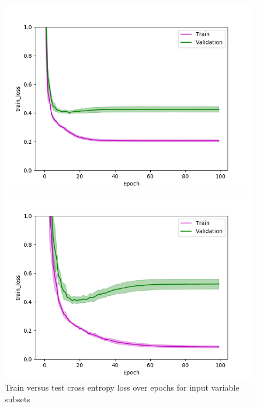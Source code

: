 \def\year{2017}\relax \documentclass[letterpaper]{article}
\begin{document}
\begin{figure}
\begin{minipage}{.24\textwidth}
  \centering
\includegraphics[width=\textwidth]{pics/d3_train_loss_mean_train_test.png}
\caption{$D_3$}\label{fig:d3losstraintest}
\end{minipage}
\begin{minipage}{.01\textwidth}
\end{minipage}
\begin{minipage}{.24\textwidth}
  \centering
\includegraphics[width=\textwidth]{pics/d4_train_loss_mean_train_test.png}
\caption{$D_4$}\label{fig:d4losstraintest}
\end{minipage}
\caption{Train versus test cross entropy loss over epochs for input variable subsets}\label{fig:traintesloss}
\end{figure}
\end{document}
